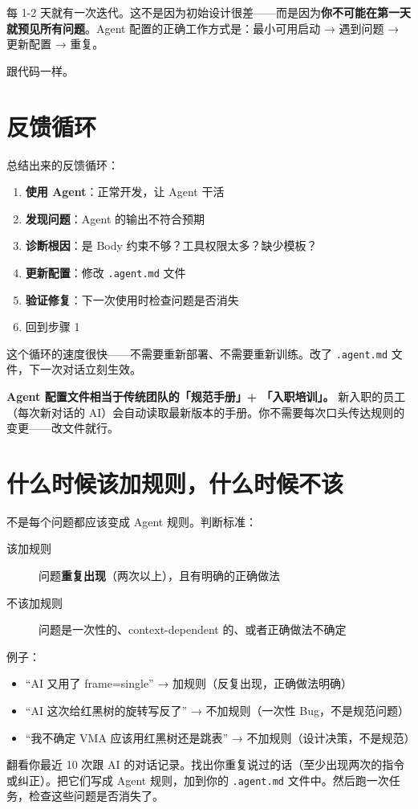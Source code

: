 每 1-2 天就有一次迭代。这不是因为初始设计很差——而是因为\textbf{你不可能在第一天就预见所有问题}。Agent 配置的正确工作方式是：最小可用启动 → 遇到问题 → 更新配置 → 重复。

跟代码一样。

\section{反馈循环}

总结出来的反馈循环：

\begin{enumerate}
  \item \textbf{使用 Agent}：正常开发，让 Agent 干活
  \item \textbf{发现问题}：Agent 的输出不符合预期
  \item \textbf{诊断根因}：是 Body 约束不够？工具权限太多？缺少模板？
  \item \textbf{更新配置}：修改 \texttt{.agent.md} 文件
  \item \textbf{验证修复}：下一次使用时检查问题是否消失
  \item 回到步骤 1
\end{enumerate}

这个循环的速度很快——不需要重新部署、不需要重新训练。改了 \texttt{.agent.md} 文件，下一次对话立刻生效。

\begin{designbox}
\textbf{Agent 配置文件相当于传统团队的「规范手册」+ 「入职培训」。} 新入职的员工（每次新对话的 AI）会自动读取最新版本的手册。你不需要每次口头传达规则的变更——改文件就行。
\end{designbox}

\section{什么时候该加规则，什么时候不该}

不是每个问题都应该变成 Agent 规则。判断标准：

\begin{description}
  \item[该加规则] 问题\textbf{重复出现}（两次以上），且有明确的正确做法
  \item[不该加规则] 问题是一次性的、context-dependent 的、或者正确做法不确定
\end{description}

例子：
\begin{itemize}
  \item ``AI 又用了 frame=single'' → 加规则（反复出现，正确做法明确）
  \item ``AI 这次给红黑树的旋转写反了'' → 不加规则（一次性 Bug，不是规范问题）
  \item ``我不确定 VMA 应该用红黑树还是跳表'' → 不加规则（设计决策，不是规范）
\end{itemize}

\begin{exercise}
翻看你最近 10 次跟 AI 的对话记录。找出你重复说过的话（至少出现两次的指令或纠正）。把它们写成 Agent 规则，加到你的 \texttt{.agent.md} 文件中。然后跑一次任务，检查这些问题是否消失了。
\end{exercise}
